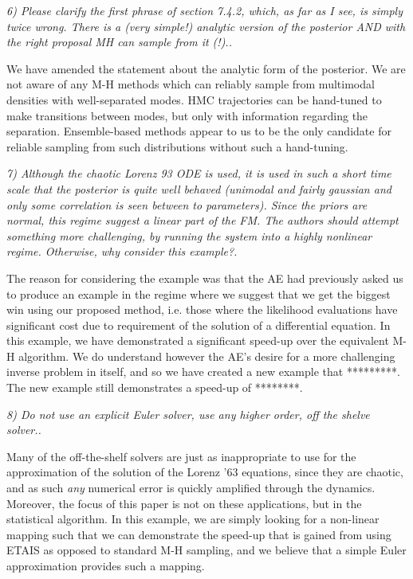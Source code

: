 \documentclass{article}
\newcommand{\comment}[2]{\vspace{0.6cm}{\bf Comment:} {\it #1.}

\vspace{0.3cm}{\bf Answer:} #2}
\begin{document}
\comment{6) Please clarify the first phrase of section 7.4.2, which, as far as I see, is simply twice wrong. There is a (very simple!) analytic version of the posterior AND with the right proposal MH can sample from it (!).}{We have amended the statement about the analytic form of the posterior. We are not aware of any M-H methods which can reliably sample from multimodal densities with well-separated modes. HMC trajectories can be hand-tuned to make transitions between modes, but only with information regarding the separation. Ensemble-based methods appear to us to be the only candidate for reliable sampling from such distributions without such a hand-tuning.}

\comment{7) Although the chaotic Lorenz 93 ODE is used, it is used in such a short time scale that the posterior is quite well behaved (unimodal and fairly gaussian and only some correlation is seen between to parameters). Since the priors are normal, this regime suggest a linear part of the FM. The authors should attempt something more challenging, by running the system into a highly nonlinear regime. Otherwise, why consider this example?}{The reason for considering the example was that the AE had previously asked us to produce an example in the regime where we suggest that we get the biggest win using our proposed method, i.e. those where the likelihood evaluations have significant cost due to requirement of the solution of a differential equation. In this example, we have demonstrated a significant speed-up over the equivalent M-H algorithm. We do understand however the AE's desire for a more challenging inverse problem in itself, and so we have created a new example that *********. The new example still demonstrates a speed-up of ********.}

\comment{8) Do not use an explicit Euler solver, use any higher order, off the shelve solver.}{Many of the off-the-shelf solvers are just as inappropriate to use for the approximation of the solution of the Lorenz '63 equations, since they are chaotic, and as such \emph{any} numerical error is quickly amplified through the dynamics. Moreover, the focus of this paper is not on these applications, but in the statistical algorithm. In this example, we are simply looking for a non-linear mapping such that we can demonstrate the speed-up that is gained from using ETAIS as opposed to standard M-H sampling, and we believe that a simple Euler approximation provides such a mapping.}
\end{document}
